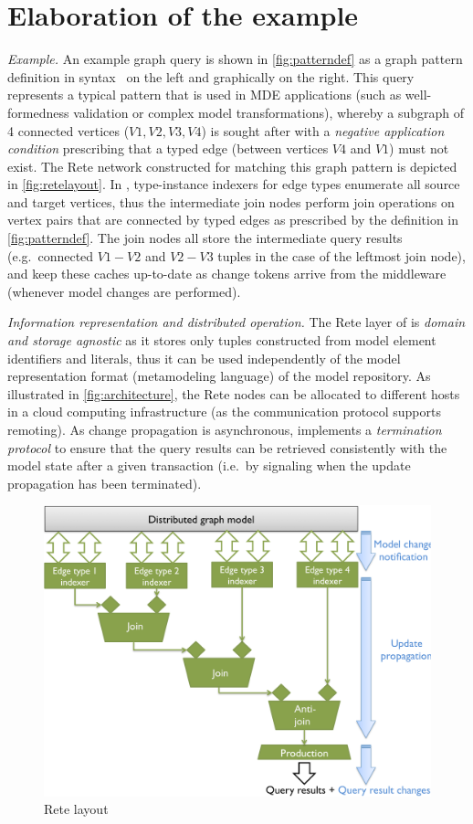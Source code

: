 \section{Elaboration of the example}

\emph{Example.}
An example graph query is shown in \autoref{fig:patterndef} %
as a graph pattern definition in \eiq{} syntax~\cite{models10} on the left and graphically on the right. This query represents a typical pattern that is used in MDE applications (such as well-formedness validation or complex model transformations), whereby a subgraph of 4 connected vertices ($V1, V2, V3, V4$) is sought after with a \emph{negative application condition} prescribing that a typed edge (between vertices $V4$ and $V1$) must not exist.
The Rete network constructed for matching this graph pattern is depicted in \autoref{fig:retelayout}. In \iqd{}, type-instance indexers for edge types enumerate all source and target vertices, thus the intermediate join nodes perform join operations on vertex pairs that are connected by typed edges as prescribed by the definition in \autoref{fig:patterndef}. The join nodes all store the intermediate query results (e.g.\ connected $V1-V2$ and $V2-V3$ tuples in the case of the leftmost join node), and keep these caches up-to-date as change tokens arrive from the middleware (whenever model changes are performed).

\emph{Information representation and distributed operation.} The Rete layer of \iqd{} is \emph{domain and storage agnostic} as it stores only tuples constructed from model element identifiers and literals, thus it can be used independently of the model representation format (metamodeling language) of the model repository.
As illustrated in \autoref{fig:architecture}, the Rete nodes can be allocated to different hosts in a cloud computing infrastructure (as the communication protocol supports remoting). As change propagation is asynchronous, \iqd{} implements a \emph{termination protocol} to ensure that the query results can be retrieved consistently with the model state after a given transaction (i.e.\ by signaling when the update propagation has been terminated).

\begin{figure}[!tb]
\begin{center}
\includegraphics[width=.8\columnwidth]{figures/reteinternals}
\caption{Rete layout}
\label{fig:retelayout}
\end{center}
\end{figure}